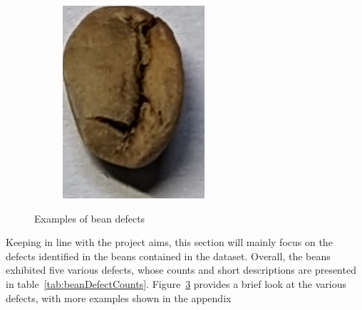 \begin{figure}[h]
\begin{subfigure}
{		}
		 \label{fig:moldBeanSingle}
	\end{subfigure}
	\begin{subfigure}
	{0.25\textwidth}
		\includegraphics[height=0.8\linewidth, keepaspectratio]{
			./figures/methodology/under-bean
		}
		 \label{fig:underBeanSingle}
	\end{subfigure}
	\caption{Examples of bean defects}
	\label{fig:beanDefects}
\end{figure}

Keeping in line with the project
aims, this section will mainly focus on the defects identified in the beans
contained in the dataset.
Overall, the beans exhibited five various defects, whose
counts and short descriptions are presented in table~\ref{tab:beanDefectCounts}.
Figure~\ref{fig:beanDefects} provides a brief look at the various defects, with more
examples shown in the appendix


